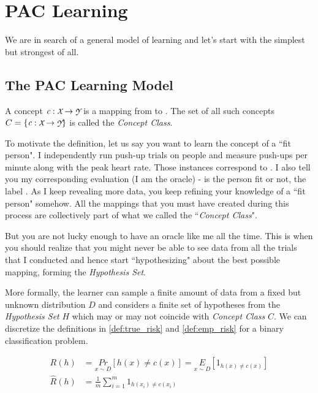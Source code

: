 \documentclass[../main]{subfiles}
\begin{document}
\chapter{PAC Learning}

We are in search of a general model of learning and let's start with the simplest but
strongest of all.

\section{The PAC Learning Model}

\begin{definition} \label{def:concept_class}
A concept $\textit{c}: \cursive{X} \to \cursive{Y}$ is a mapping from  to 
. The set of all such concepts $C = \{\textit{c}: \cursive{X} \to \cursive{Y}\}$
is called the \textit{Concept Class}.
\end{definition}

To motivate the definition, let us say you want to learn the concept of a ``fit person". I
independently run push-up trials on people and measure push-ups per minute along
with the peak heart rate. Those instances correspond to . I also tell you
my corresponding evaluation (I am the oracle) - is the person fit or not, the label
. As I keep revealing more data, you keep refining your knowledge of a
``fit person" somehow. All the mappings that you must have created during this process 
are collectively part of what we called the ``\textit{Concept Class}".

But you are not lucky enough to have an oracle like me all the time. This is when you
should realize that you might never be able to see data from all the trials that I conducted
and hence start ``hypothesizing" about the best possible mapping, forming the \textit{Hypothesis Set}.

More formally, the learner can sample a finite amount of data from a fixed but unknown
distribution $D$ and considers a finite set of hypotheses from the \textit{Hypothesis Set}
$H$ which may or may not coincide with \textit{Concept Class} $C$. We can discretize
the definitions in \ref{def:true_risk} and \ref{def:emp_risk} for a binary classification 
problem.

\begin{align}
R(h) &= \underset{x \sim D}{Pr}[h(x) \neq c(x)] = \underset{x \sim D}{E}[1_{h(x) \neq c(x)}] \nonumber \\
\hat{R}(h) &= \frac{1}{m} \sum_{i=1}^{m} 1_{h(x_i) \neq c(x_i)}
\end{align}
\end{document}
